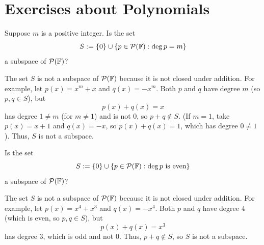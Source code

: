 \section*{Exercises about Polynomials}

\begin{xrcs}
  Suppose $m$ is a positive integer. Is the set
  \begin{equation}
    S := \{0\} \cup \{ p \in \mathcal{P} (\mathbb{F}) : \deg p = m \}
  \end{equation}
  a subspace of $\mathcal{P} (\mathbb{F})$?

  \begin{xsol}
    The set $S$ is not a subspace of $\mathcal{P} (\mathbb{F})$ because it is not closed under addition.
    For example, let $p(x) = x^m + x$ and $q(x) = -x^m$. Both $p$ and $q$ have degree $m$ (so $p, q \in S$), but
    \[
      p(x) + q(x) = x
    \]
    has degree $1 \neq m$ (for $m \neq 1$) and is not $0$, so $p+q \notin S$. (If $m=1$, take $p(x)=x+1$ and $q(x)=-x$, so $p(x)+q(x)=1$, which has degree $0 \neq 1$). Thus, $S$ is not a subspace.
  \end{xsol}
\end{xrcs}

\begin{xrcs}
  Is the set
  \begin{equation}
    S := \{0\} \cup \{ p \in \mathcal{P} (\mathbb{F}) : \deg p \text{ is even} \}
  \end{equation}
  a subspace of $\mathcal{P} (\mathbb{F})$?

  \begin{xsol}
    The set $S$ is not a subspace of $\mathcal{P} (\mathbb{F})$ because it is not closed under addition.
    For example, let $p(x) = x^4 + x^3$ and $q(x) = -x^4$. Both $p$ and $q$ have degree $4$ (which is even, so $p, q \in S$), but
    \[
      p(x) + q(x) = x^3
    \]
    has degree $3$, which is odd and not $0$. Thus, $p+q \notin S$, so $S$ is not a subspace.
  \end{xsol}
\end{xrcs}

